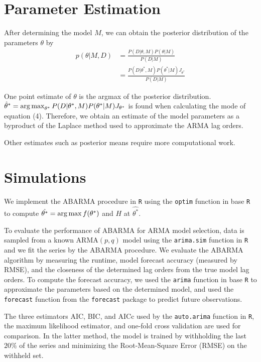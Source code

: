 \section{Parameter Estimation}
\label{sec: params}
After determining the model $M$, we can obtain the posterior distribution of the parameters $\theta$ by
\begin{align*}
    p(\theta|M,D) 
    &= \frac{P(D|\theta,M)P(\theta|M)}{P(D|M)} \\
    &= \frac{P(D|\theta^*,M)P(\theta^*|M)J_{\theta^*}}{P(D|M)} 
\end{align*}
    
One point estimate of $\theta$ is the argmax of the posterior distribution. $\hat{\theta}^* = \operatorname*{arg\,max}_{\theta^*} P(D|\theta^*,M)P(\theta^*|M)J_{\theta^*}$ is found when calculating the mode of equation (4). Therefore, we obtain an estimate of the model parameters as a byproduct of the Laplace method used to approximate the ARMA lag orders.

Other estimates such as posterior means require more computational work.

\section{Simulations}
\label{sec: simulations}

We implement the ABARMA procedure in {\tt R} using the {\tt optim} function in base {\tt R} to compute $\hat{\theta^*} = \operatorname*{arg\,max} f(\theta^*)$ and $H$ at $\hat{\theta^*}$.

To evaluate the performance of ABARMA for ARMA model selection, data is sampled from a known ARMA$(p,q)$ model using the {\tt arima.sim} function in {\tt R} and we fit the series by the ABARMA procedure.  We evaluate the ABARMA algorithm by measuring the runtime, model forecast accuracy (measured by RMSE), and the closeness of the determined lag orders from the true model lag orders.  To compute the forecast accuracy, we used the {\tt arima} function in base {\tt R} to approximate the parameters based on the determined model, and used the {\tt forecast} function from the {\tt forecast} package to predict future observations.

The three estimators AIC, BIC, and AICc used by the {\tt auto.arima} function in {\tt R}, the maximum likelihood estimator, and one-fold cross validation are used for comparison.  In the latter method, the model is trained by withholding the last $20\%$ of the series and minimizing the Root-Mean-Square Error (RMSE) on the withheld set.  


